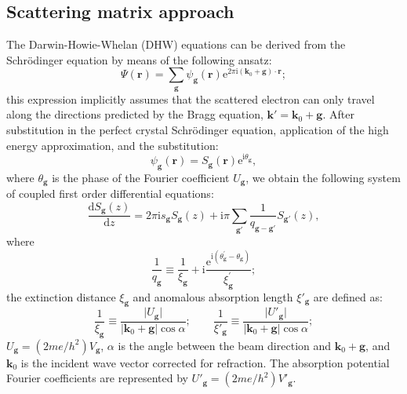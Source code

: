 \documentclass[12pt]{amsart}
\begin{document}
\subsection{Scattering matrix approach}
The Darwin-Howie-Whelan (DHW) equations can be derived from the Schr\"odinger equation by means of the following ansatz:
\begin{equation}
	\Psi(\mathbf{r}) = \sum_{\mathbf{g}} \psi_{\mathbf{g}}(\mathbf{r}) 
	\mathrm{e}^{2\pi\mathrm{i}(\mathbf{k}_0+\mathbf{g})\cdot\mathbf{r}};\label{eq:planewaves}
\end{equation}
this expression implicitly assumes that the scattered electron can only travel along the directions predicted by the 
Bragg equation, $\mathbf{k}'=\mathbf{k}_0+\mathbf{g}$.  After substitution in the perfect crystal Schr\"odinger equation,
application of the high energy approximation, and the substitution:
\begin{equation}
	\psi_\mathbf{g}(\mathbf{r}) = S_{\mathbf{g}}(\mathbf{r}) \mathrm{e}^{\mathrm{i}\theta_{\mathbf{g}}},\label{eq:psig}
\end{equation}
where $\theta_{\mathbf{g}}$ is the phase of the Fourier coefficient $U_{\mathbf{g}}$, we obtain the following system of 
coupled first order differential equations:
\begin{equation}
    \frac{\mathrm{d} S_{\mathbf{g}}(z)}{\mathrm{d}z} =
    2\pi\mathrm{i}s_{\mathbf{g}}S_{\mathbf{g}}(z) + \mathrm{i}\pi {\sum_{\mathbf{g}'}}
    \frac{1}
    {q_{\mathbf{g}-\mathbf{g}'}}S_{\mathbf{g}'}(z),\label{eq:defectequation}
\end{equation}
where
\begin{equation}
	\frac{1}{q_{\mathbf{g}}} \equiv \frac{1}{\xi_{\mathbf{g}}} + \mathrm{i}
	\frac{\mathrm{e}^{\mathrm{i} (\theta^{\prime}_{\mathbf{g}}-\theta_{\mathbf{g}})}}{\xi^{\prime}_{\mathbf{g}}};
	\label{eq:defineq}
\end{equation}
the extinction distance $\xi_{\mathbf{g}}$ and anomalous absorption length $\xi'_{\mathbf{g}}$ are defined as:
\begin{equation}
	\frac{1}{\xi_{\mathbf{g}}}\equiv \frac{\vert U_{\mathbf{g}}\vert}{\vert\mathbf{k}_0+\mathbf{g}\vert\cos\alpha};\qquad
	\frac{1}{\xi'_{\mathbf{g}}}\equiv \frac{\vert U'_{\mathbf{g}}\vert}{\vert\mathbf{k}_0+\mathbf{g}\vert\cos\alpha};
\end{equation}
$U_{\mathbf{g}} = (2me/h^2) V_{\mathbf{g}} $, $\alpha$ is the angle between the beam direction and $\mathbf{k}_0+\mathbf{g}$, and $\mathbf{k}_0$ is 
the incident wave vector corrected for refraction.  The absorption potential Fourier coefficients are represented by $U'_{\mathbf{g}} = (2me/h^2) V'_{\mathbf{g}}$.
\end{document}
